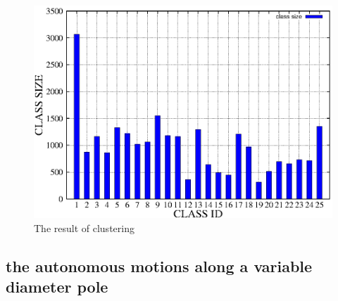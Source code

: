 \begin{figure}[t]
	\centering
	\includegraphics[width=0.8\linewidth]{fig/experiment/170912/cluster}
	\caption{The result of clustering}
\end{figure}

\subsection{the autonomous motions along a variable diameter pole}

